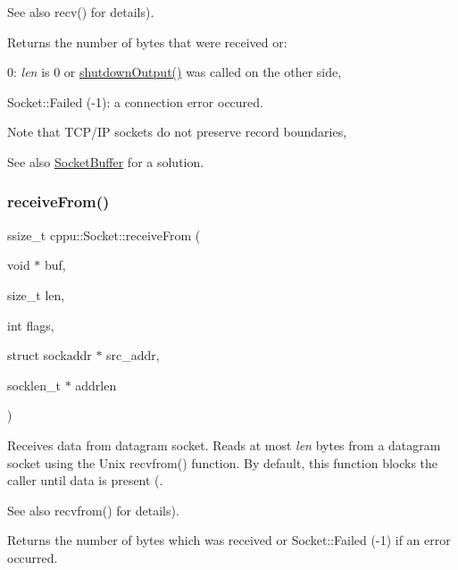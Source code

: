 \begin{DoxySeeAlso}{See also}
recv() for details).
\end{DoxySeeAlso}
\begin{DoxyReturn}{Returns}
the number of bytes that were received or\+:
\begin{DoxyItemize}
\item 0\+: {\itshape len} is 0 or \mbox{\hyperlink{classcppu_1_1_socket_a97ee9ef3bf9fdecd6ae6f2b583b34d0e}{shutdown\+Output()}} was called on the other side,
\item Socket\+::\+Failed (-\/1)\+: a connection error occured.
\end{DoxyItemize}
\end{DoxyReturn}
\begin{DoxyNote}{Note}
that T\+C\+P/\+IP sockets do not preserve record boundaries, 
\end{DoxyNote}
\begin{DoxySeeAlso}{See also}
\mbox{\hyperlink{classcppu_1_1_socket_buffer}{Socket\+Buffer}} for a solution. 
\end{DoxySeeAlso}
\mbox{\label{classcppu_1_1_socket_abd460be82deeb29e730fc83f871e51c4}} 
\subsubsection{\texorpdfstring{receiveFrom()}{receiveFrom()}}
{\footnotesize\ttfamily ssize\+\_\+t cppu\+::\+Socket\+::receive\+From (\begin{DoxyParamCaption}\item[{void $\ast$}]{buf,  }\item[{size\+\_\+t}]{len,  }\item[{int}]{flags,  }\item[{struct sockaddr $\ast$}]{src\+\_\+addr,  }\item[{socklen\+\_\+t $\ast$}]{addrlen }\end{DoxyParamCaption})\hspace{0.3cm}{\ttfamily [inline]}}



Receives data from datagram socket. Reads at most {\itshape len} bytes from a datagram socket using the Unix recvfrom() function. By default, this function blocks the caller until data is present (. 

\begin{DoxySeeAlso}{See also}
recvfrom() for details). 
\end{DoxySeeAlso}
\begin{DoxyReturn}{Returns}
the number of bytes which was received or Socket\+::\+Failed (-\/1) if an error occurred. 
\end{DoxyReturn}
\mbox{\label{classcppu_1_1_socket_aeac77f859159715e2d63a5a0dc118788}} 
